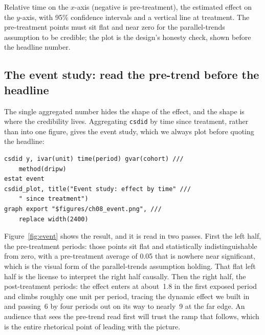 \documentclass[
    a4paper,
    fontsize=10pt,
    twoside=true,
    numbers=noenddot,
]{kaobook}
\newenvironment{vizcallout}[1][Visualization to build]{%
    \begin{vizbox}[frametitle={#1}]%
}{%
    \end{vizbox}%
}
\begin{document}
\begin{vizcallout}[Visualization to build: the event-study plot]
Relative time on the $x$-axis (negative is pre-treatment), the estimated effect on the $y$-axis, with 95\% confidence intervals and a vertical line at treatment. The pre-treatment points must sit flat and near zero for the parallel-trends assumption to be credible; the plot is the design's honesty check, shown before the headline number.
\end{vizcallout}

\subsection{The event study: read the pre-trend before the headline}
The single aggregated number hides the shape of the effect, and the shape is where the credibility lives. Aggregating \texttt{csdid} by time since treatment, rather than into one figure, gives the event study, which we always plot before quoting the headline:
{\footnotesize
\begin{verbatim}
csdid y, ivar(unit) time(period) gvar(cohort) ///
    method(dripw)
estat event
csdid_plot, title("Event study: effect by time" ///
    " since treatment")
graph export "$figures/ch08_event.png", ///
    replace width(2400)
\end{verbatim}
}
Figure~\ref{fig:event} shows the result, and it is read in two passes. First the left half, the pre-treatment periods: those points sit flat and statistically indistinguishable from zero, with a pre-treatment average of 0.05 that is nowhere near significant, which is the visual form of the parallel-trends assumption holding. That flat left half is the license to interpret the right half causally. Then the right half, the post-treatment periods: the effect enters at about~1.8 in the first exposed period and climbs roughly one unit per period, tracing the dynamic effect we built in and passing~6 by four periods out on its way to nearly~9 at the far edge. An audience that sees the pre-trend read first will trust the ramp that follows, which is the entire rhetorical point of leading with the picture.
\end{document}
